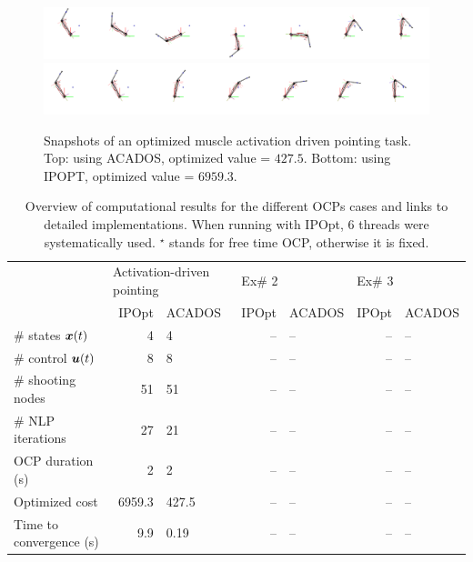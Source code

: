  

%
\begin{figure}[t!]
\centering
\includegraphics[width=\textwidth]{figures/activation_pointing_snapshots_acados.png}\\
\vspace*{0.5em}
\includegraphics[width=\textwidth]{figures/activation_pointing_snapshots_ipopt.png}
\caption{Snapshots of an optimized muscle activation driven pointing task. Top: using ACADOS, optimized value = $427.5$. Bottom: using IPOPT, optimized value = $6959.3$.}
\label{fig:snapshots_activation_driven_pointing}
\end{figure}
%

%
\begin{table}[t!]
\caption{\small Overview of computational results for the different OCPs cases and links to detailed implementations. When running with IPOpt, 6 threads were systematically used. $^\star$ stands for free time OCP, otherwise it is fixed.}
\label{tab:Perfs_and_detailed_implementations_of_each_example}
\centering
\begin{tabular}{l rl rl rl}
\toprule
& \multicolumn{2}{l}{Activation-driven pointing} & \multicolumn{2}{l}{Ex\# 2} & \multicolumn{2}{l}{Ex\# 3} \\
\cmidrule[\heavyrulewidth](lr){2-3}
\cmidrule[\heavyrulewidth](lr){4-5}
\cmidrule[\heavyrulewidth](lr){6-7}
                           & IPOpt  & ACADOS & IPOpt & ACADOS & IPOpt & ACADOS\\
\# states $\bm{x}(t)$            & 4      & 4      & --    & --     & --    & --\\
\# control $\bm{u}(t)$           & 8      & 8      & --    & --     & --    & --\\
\# shooting nodes          & 51     & 51     & --    & --     & --    & --\\
\# NLP iterations          & 27     & 21     & --    & --     & --    & --\\
OCP duration (s)           & 2      & 2      & --    & --     & --    & --\\
Optimized cost             & 6959.3 & 427.5  & --    & --     & --    & --\\
Time to convergence (s)    & 9.9    & 0.19   & --    & --     & --    & --\\
\bottomrule
\end{tabular}
\end{table}
%